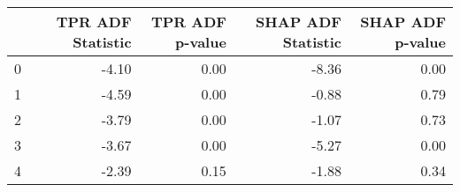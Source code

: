 \begin{tabular}{lrrrr}
\toprule
 & TPR ADF Statistic & TPR ADF p-value & SHAP ADF Statistic & SHAP ADF p-value \\
\midrule
0 & -4.10 & 0.00 & -8.36 & 0.00 \\
1 & -4.59 & 0.00 & -0.88 & 0.79 \\
2 & -3.79 & 0.00 & -1.07 & 0.73 \\
3 & -3.67 & 0.00 & -5.27 & 0.00 \\
4 & -2.39 & 0.15 & -1.88 & 0.34 \\
\bottomrule
\end{tabular}
